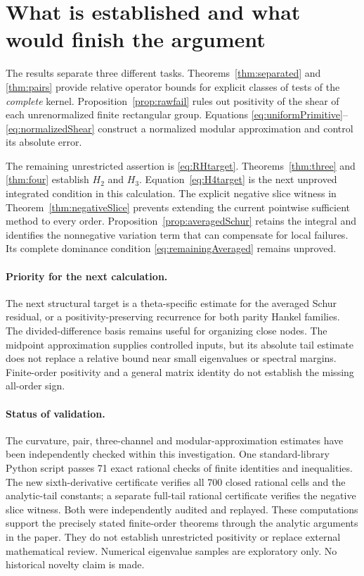 \documentclass[11pt,letterpaper]{article}
\numberwithin{equation}{section}
\theoremstyle{remark}\newtheorem{remark}[theorem]{Remark}
\begin{document}



\section{What is established and what would finish the argument}
The results separate three different tasks. Theorems~\ref{thm:separated} and \ref{thm:pairs} provide relative operator bounds for explicit classes of tests of the \emph{complete} kernel. Proposition~\ref{prop:rawfail} rules out positivity of the shear of each unrenormalized finite rectangular group. Equations \eqref{eq:uniformPrimitive}--\eqref{eq:normalizedShear} construct a normalized modular approximation and control its absolute error.

The remaining unrestricted assertion is \eqref{eq:RHtarget}. Theorems~\ref{thm:three} and \ref{thm:four} establish $H_2$ and $H_3$. Equation~\eqref{eq:H4target} is the next unproved integrated condition in this calculation. The explicit negative slice witness in Theorem~\ref{thm:negativeSlice} prevents extending the current pointwise sufficient method to every order. Proposition~\ref{prop:averagedSchur} retains the integral and identifies the nonnegative variation term that can compensate for local failures. Its complete dominance condition \eqref{eq:remainingAveraged} remains unproved.

\paragraph{Priority for the next calculation.}
The next structural target is a theta-specific estimate for the averaged Schur residual, or a positivity-preserving recurrence for both parity Hankel families. The divided-difference basis remains useful for organizing close nodes. The midpoint approximation supplies controlled inputs, but its absolute tail estimate does not replace a relative bound near small eigenvalues or spectral margins. Finite-order positivity and a general matrix identity do not establish the missing all-order sign.

\paragraph{Status of validation.}
The curvature, pair, three-channel and modular-approximation estimates have been independently checked within this investigation. One standard-library Python script passes 71 exact rational checks of finite identities and inequalities. The new sixth-derivative certificate verifies all 700 closed rational cells and the analytic-tail constants; a separate full-tail rational certificate verifies the negative slice witness. Both were independently audited and replayed. These computations support the precisely stated finite-order theorems through the analytic arguments in the paper. They do not establish unrestricted positivity or replace external mathematical review. Numerical eigenvalue samples are exploratory only. No historical novelty claim is made.
\end{document}
